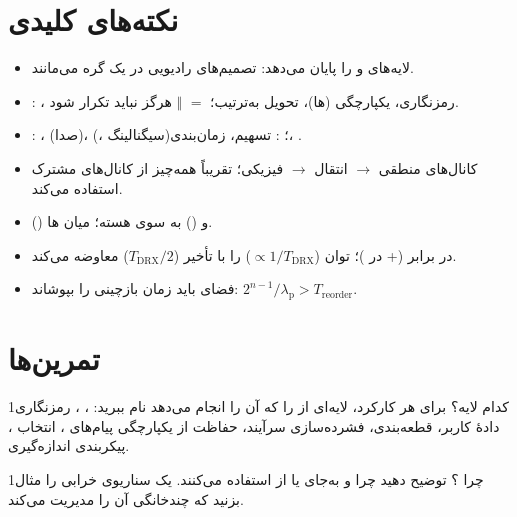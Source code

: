 \documentclass[11pt,a4paper]{article}
\begin{document}
\section{نکته‌های کلیدی}
\begin{takeawaybox}
\begin{itemize}
  \item {} لایه‌های  و  را پایان می‌دهد: تصمیم‌های رادیویی در یک گره می‌مانند.
  \item {}: ، رمزنگاری، یکپارچگی (ها)، تحویل به‌ترتیب؛  $=$  $\Vert$  هرگز نباید تکرار شود.
  \item {}: ،  (صدا)،  (، سیگنالینگ)؛ : تسهیم، زمان‌بندی، .
  \item کانال‌های منطقی $\to$ انتقال $\to$ فیزیکی؛ تقریباً همه‌چیز از کانال‌های مشترک استفاده می‌کند.
  \item {} () و  () به سوی هسته؛  میان ها.
  \item {} در برابر  (+  در )؛  توان
        ($\propto1/T_{\mathrm{DRX}}$) را با تأخیر ($T_{\mathrm{DRX}}/2$) معاوضه می‌کند.
  \item فضای  باید زمان بازچینی را بپوشاند: $2^{n-1}/\lambda_\mathrm{p} > T_{\mathrm{reorder}}$.
\end{itemize}
\end{takeawaybox}

\section{تمرین‌ها}

\begin{exercisebox}{1}{کدام لایه؟}\label{exr:layer}
برای هر کارکرد، لایه‌ای از  را که آن را انجام می‌دهد نام ببرید: ، ، رمزنگاری دادهٔ
کاربر، قطعه‌بندی، فشرده‌سازی سرآیند، حفاظت از یکپارچگی پیام‌های ، انتخاب ، پیکربندی اندازه‌گیری.
\end{exercisebox}

\begin{exercisebox}{1}{چرا ؟}\label{exr:sctp}
توضیح دهید چرا  و  به‌جای  یا  از  استفاده می‌کنند. یک سناریوی
خرابی را مثال بزنید که چندخانگی آن را مدیریت می‌کند.
\end{exercisebox}
\end{document}
